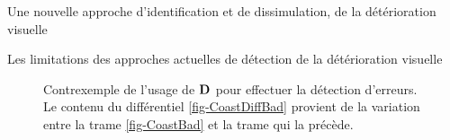 \begin{chapter}{Une nouvelle approche d'identification et de dissimulation, de
la détérioration visuelle}
\begin{section}{Les limitations des approches actuelles de détection de la
détérioration visuelle}
\begin{figure}
	\caption[Contrexemple de l'usage de $\ltD{}$ pour la détection
d'erreurs]{Contrexemple de l'usage de $\ltD{}$ pour effectuer la détection
d'erreurs. Le contenu du différentiel \ref{fig-CoastDiffBad} provient de la
variation entre la trame \ref{fig-CoastBad} et la trame qui la précède.}
	\label{fig-Coastguard}
\end{figure}


\end{section}
\end{chapter}
